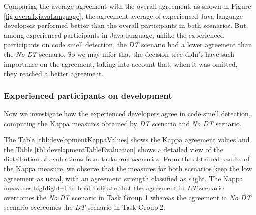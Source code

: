Comparing the average agreement with the overall agreement, as shown in Figure \ref{fig:overallxjavaLanguage}, the agreement average of experienced Java language developers performed better than the overall participants in both scenarios. But, among experienced participants in Java language, unlike the experienced participants on code smell detection, the \textit{DT} scenario had a lower agreement than the \textit{No DT} scenario. So we may infer that the decision tree didn't have such importance on the agreement, taking into account that, when it was omitted, they reached a better agreement.

\subsubsection{Experienced participants on development} \label{sec:participantsDevelopmentAgreement}    
Now we investigate how the experienced developers agree in code smell detection, computing the Kappa measures obtained by \textit{DT} scenario and \textit{No DT} scenario.

The Table \ref{tbl:developmentKappaValues} shows the Kappa agreement values and the Table \ref{tbl:developmentTableEvaluation} shows a detailed view of the distribution of evaluations from tasks and scenarios. From the obtained results of the Kappa measure, we observe that the measures for both scenarios keep the low agreement as usual, with an agreement strength classified as slight.
The Kappa measures highlighted in bold indicate that the agreement in \textit{DT} scenario overcomes the \textit{No DT} scenario in Task Group 1 whereas the agreement in \textit{No DT} scenario overcomes the \textit{DT} scenario in Task Group 2. %

